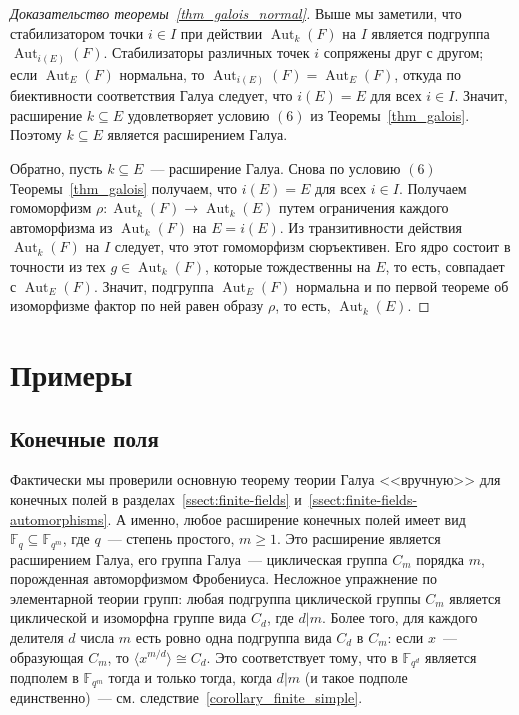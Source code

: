 \documentclass[a4paper,11pt]{scrartcl}
\theoremstyle{plain}
\theoremstyle{definition}
\newcommand\mb{\mathbb}
\newcommand\isom{\cong}
\newcommand\sseq{\subseteq}
\newcommand\la{\langle}
\newcommand\ra{\rangle}
\newcommand\Aut{\operatorname{Aut}}
\begin{document}
\begin{proof}[Доказательство теоремы~\ref{thm_galois_normal}]
Выше мы заметили, что стабилизатором точки $i\in I$ при действии
$\Aut_k(F)$ на $I$ является подгруппа $\Aut_{i(E)}(F)$. Стабилизаторы
различных точек $i$ сопряжены друг с другом; если $\Aut_E(F)$
нормальна, то $\Aut_{i(E)}(F)=\Aut_E(F)$, откуда по биективности
соответствия Галуа следует, что $i(E)=E$ для всех $i\in I$. Значит,
расширение $k\sseq E$ удовлетворяет условию $(6)$ из
Теоремы~\ref{thm_galois}. Поэтому $k\sseq E$ является расширением
Галуа.

Обратно, пусть $k\sseq E$~--- расширение Галуа. Снова по условию
$(6)$ Теоремы~\ref{thm_galois} получаем, что $i(E)=E$ для всех $i\in
I$. Получаем гомоморфизм $\rho\colon \Aut_k(F)\to\Aut_k(E)$ путем
ограничения каждого автоморфизма из $\Aut_k(F)$ на $E=i(E)$. Из
транзитивности действия $\Aut_k(F)$ на $I$ следует, что этот
гомоморфизм сюръективен. Его ядро состоит в точности из тех
$g\in\Aut_k(F)$, которые тождественны на $E$, то есть, совпадает с
$\Aut_E(F)$. Значит, подгруппа $\Aut_E(F)$ нормальна и по первой
теореме об изоморфизме фактор по ней равен образу $\rho$, то есть,
$\Aut_k(E)$.
\end{proof}

\section{Примеры}

\subsection{Конечные поля}

Фактически мы проверили основную теорему теории Галуа <<вручную>> для
конечных полей в разделах~\ref{ssect:finite-fields}
и~\ref{ssect:finite-fields-automorphisms}.
А именно, любое расширение конечных полей имеет
вид $\mb F_q\subseteq\mb F_{q^m}$, где $q$~--- степень простого,
$m\geq 1$.
Это расширение является расширением Галуа, его группа Галуа~---
циклическая группа $C_m$ порядка $m$, порожденная автоморфизмом
Фробениуса.
Несложное упражнение по элементарной теории групп:
любая подгруппа циклической группы $C_m$ является циклической и
изоморфна группе вида $C_d$, где $d|m$.
Более того, для каждого делителя $d$ числа $m$ есть ровно одна
подгруппа вида $C_d$ в $C_m$: если $x$~--- образующая $C_m$,
то $\la x^{m/d}\ra \isom C_d$.
Это соответствует тому, что в $\mb F_{q^d}$ является подполем в
$\mb F_{q^m}$ тогда и только тогда, когда $d|m$ (и такое подполе
единственно)~--- см. следствие~\ref{corollary_finite_simple}.
\end{document}
